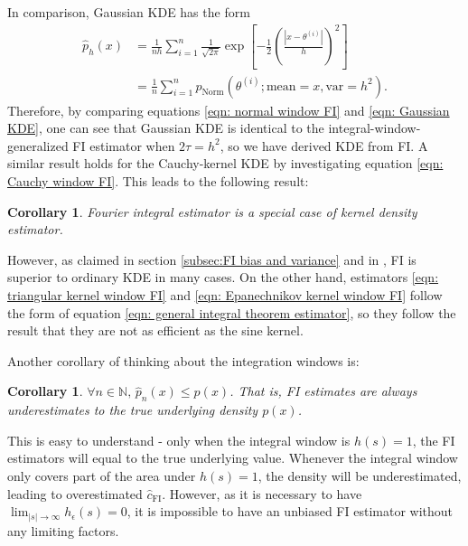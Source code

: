 \documentclass[%
 reprint,
 amsmath,amssymb,
 aps,
]{revtex4-2}
\newtheorem{corollary}[theorem]{Corollary}
\def\N{\mathbb{N}}
\begin{document}
In comparison, Gaussian KDE has the form
\begin{align} \label{eqn: Gaussian KDE}
    \hat{p}_h(x) & = \frac{1}{nh}\sum_{i = 1}^n \frac{1}{\sqrt{2\pi}}\exp\left[-\frac{1}{2}\left(\frac{|x - \theta^{(i)}|}{h} \right)^2 \right] \\
    & = \frac{1}{n}\sum_{i = 1}^n p_\text{Norm}(\theta^{(i)}; \text{mean} = x, \text{var} = h^2).
\end{align}
Therefore, by comparing equations \eqref{eqn: normal window FI} and \eqref{eqn: Gaussian KDE}, one can see that Gaussian KDE is identical to the integral-window-generalized FI estimator when $2\tau = h^2$, so we have derived KDE from FI. A similar result holds for the Cauchy-kernel KDE by investigating equation \eqref{eqn: Cauchy window FI}. This leads to the following result:

\begin{corollary}
Fourier integral estimator is a special case of kernel density estimator.
\end{corollary}

However, as claimed in section \ref{subsec:FI bias and variance} and in \cite{rotiroti2022computing}, FI is superior to ordinary KDE in many cases. On the other hand, estimators \eqref{eqn: triangular kernel window FI} and \eqref{eqn: Epanechnikov kernel window FI} follow the form of equation \eqref{eqn: general integral theorem estimator}, so they follow the result \cite{ho2021integral} that they are not as efficient as the sine kernel.

Another corollary of thinking about the integration windows is:
\begin{corollary} \label{corollary: FI estimators underestimate densities}
    $\forall n \in \N, \, \hat{p}_n(x) \le p(x)$. That is, FI estimates are always underestimates to the true underlying density $p(x)$.
\end{corollary}

This is easy to understand - only when the integral window is $h(s) = 1$, the FI estimators will equal to the true underlying value. Whenever the integral window only covers part of the area under $h(s) = 1$, the density will be underestimated, leading to overestimated $\hat{c}_\text{FI}$. However, as it is necessary to have $\displaystyle\lim_{|s| \to \infty} h_\epsilon(s) = 0$, it is impossible to have an unbiased FI estimator without any limiting factors.
\end{document}
